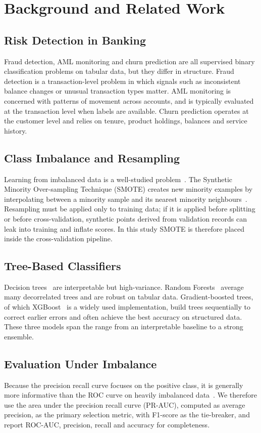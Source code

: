 \documentclass[10pt,twocolumn,a4paper]{article}
\newcommand{\prauc}{PR-AUC}
\newcommand{\rocauc}{ROC-AUC}
\begin{document}
\section{Background and Related Work}
\subsection{Risk Detection in Banking}
Fraud detection, AML monitoring and churn prediction are all supervised binary classification problems on tabular data, but they differ in structure. Fraud detection is a transaction-level problem in which signals such as inconsistent balance changes or unusual transaction types matter. AML monitoring is concerned with patterns of movement across accounts, and is typically evaluated at the transaction level when labels are available. Churn prediction operates at the customer level and relies on tenure, product holdings, balances and service history.

\subsection{Class Imbalance and Resampling}
Learning from imbalanced data is a well-studied problem~\cite{he2009}. The Synthetic Minority Over-sampling Technique (SMOTE) creates new minority examples by interpolating between a minority sample and its nearest minority neighbours~\cite{chawla2002}. Resampling must be applied only to training data; if it is applied before splitting or before cross-validation, synthetic points derived from validation records can leak into training and inflate scores. In this study SMOTE is therefore placed inside the cross-validation pipeline.

\subsection{Tree-Based Classifiers}
Decision trees~\cite{breiman1984} are interpretable but high-variance. Random Forests~\cite{breiman2001} average many decorrelated trees and are robust on tabular data. Gradient-boosted trees, of which XGBoost~\cite{chen2016} is a widely used implementation, build trees sequentially to correct earlier errors and often achieve the best accuracy on structured data. These three models span the range from an interpretable baseline to a strong ensemble.

\subsection{Evaluation Under Imbalance}
Because the precision recall curve focuses on the positive class, it is generally more informative than the ROC curve on heavily imbalanced data~\cite{saito2015,davis2006}. We therefore use the area under the precision recall curve (\prauc{}), computed as average precision, as the primary selection metric, with F1-score as the tie-breaker, and report \rocauc{}, precision, recall and accuracy for completeness.
\end{document}
